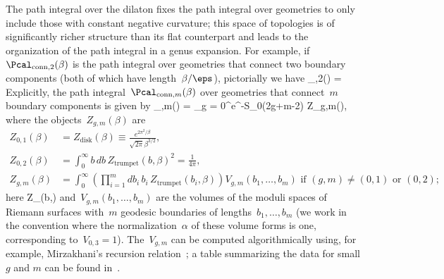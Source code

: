 \documentclass[12pt]{article}
\begin{document}
The path integral over the dilaton fixes the path integral over geometries to only include those with constant negative curvature; this space of topologies is of significantly richer structure than its flat counterpart and leads to the organization of the path integral in a genus expansion.  For example, if~$\Pcal_{\mathrm{conn},2}(\beta)$ is the path integral over geometries that connect two boundary components (both of which have length~$\beta/\eps$), pictorially we have
\be
\Pcal_{,2}(\beta) = 
\ee
Explicitly, the path integral~$\Pcal_{\mathrm{conn},m}(\beta)$ over geometries that connect~$m$ boundary components is given by
\be
\label{eq:JTgenusexpansion}
\Pcal_{,m}(\beta) = \sum_{g = 0}^\infty e^{-S_0(2g+m-2)} Z_{g,m}(\beta),
\ee
where the objects~$Z_{g,m}(\beta)$ are
\begin{subequations}
\label{eqs:Zgm}
\begin{align}
Z_{0,1}(\beta) &= Z_\mathrm{disk}(\beta) \equiv  \frac{e^{2\pi^2/\beta}}{\sqrt{2\pi} \beta^{3/2}}, \\
Z_{0,2}(\beta) &= \int_0^\infty b \, db \, Z_\mathrm{trumpet}(b,\beta)^2 = \frac{1}{4\pi}, \\
Z_{g,m}(\beta) &= \int_0^\infty \left(\prod_{i = 1}^m db_i \, b_i \, Z_\mathrm{trumpet}(b_i,\beta) \right) V_{g,m}(b_1, \ldots, b_m) \mbox{ if } (g,m) \neq (0,1) \mbox{ or } (0,2); \label{subeq:ZgmVgm}
\end{align}
\end{subequations}
here
\be
Z_(b,\beta) \equiv {}
\ee
and~$V_{g,m}(b_1, \ldots, b_m)$ are the volumes of the moduli spaces of Riemann surfaces with~$m$ geodesic boundaries of lengths~$b_1, \ldots, b_m$ (we work in the convention where the normalization~$\alpha$ of these volume forms is one, corresponding to~$V_{0,3} = 1$).  The~$V_{g,m}$ can be computed algorithmically using, for example, Mirzakhani's recursion relation~\cite{Mir06}; a table summarizing the data for small $g$ and $m$ can be found in~\cite{Do11}.
\end{document}
